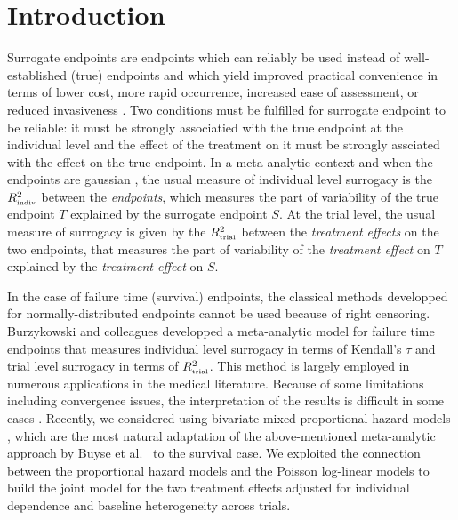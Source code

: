 \documentclass[]{scrartcl}\usepackage[]{graphicx}\usepackage[]{color}
\begin{document}
{%

\section{Introduction}

Surrogate endpoints are endpoints which can reliably be used
  instead of well-established (true) endpoints
  and which yield improved practical convenience
  in terms of lower cost,
  more rapid occurrence,
  increased ease of assessment, 
  or reduced invasiveness \citep{Burzykowski2006}.
Two conditions must be fulfilled for surrogate endpoint to be reliable:
  it must be strongly associatied with
  the true endpoint at the individual level and
  the effect of the treatment on it
  must be strongly assciated with the effect on the true endpoint.
In a meta-analytic context and when the endpoints are gaussian \citep{BuyseEtal00},
  the usual measure of individual level surrogacy is
  the $R^2_\text{\tiny indiv}$ between the \textit{endpoints},
  which measures the part of variability of the true endpoint $T$
  explained by the surrogate endpoint $S$.
At the trial level, the usual measure of surrogacy
  is given by the $R^2_\text{\tiny trial}$
  between the \textit{treatment effects} on the two endpoints,
  that measures the part of variability of the \textit{treatment effect} on $T$
  explained by the \textit{treatment effect} on $S$.

In the case of failure time (survival) endpoints,
  the classical methods developped for normally-distributed endpoints
  cannot be used because of right censoring.
Burzykowski and colleagues \cite{BurzykowskiEtal01} developped a meta-analytic model
  for failure time endpoints that measures
  individual level surrogacy in terms of Kendall's $\tau$ \citep{Kendall38}
  and trial level surrogacy in terms of $R^2_\text{\tiny trial}$.
This method is largely employed in numerous applications in the medical literature.
Because of some limitations including convergence issues,
  the interpretation of the results is difficult in some cases
  \citep{Oba2013, BurzykowskiCortinas05}.
Recently, we considered using bivariate mixed proportional hazard models
   \citep{DuchateauJanssen08},
  which are the most natural adaptation of the above-mentioned
  meta-analytic approach by Buyse et al.~\cite{BuyseEtal00} to the survival case.
We exploited \citep{RotoloPoissurogate}
  the connection between the proportional hazard models
  and the Poisson log-linear models \citep{Whitehead80, LairdOlivier81}
  to build the joint model for the two treatment effects adjusted
  for individual dependence and baseline heterogeneity across trials.

}
\end{document}
